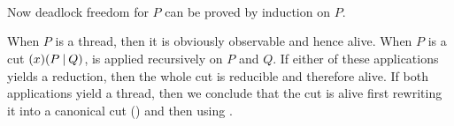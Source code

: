 \begin{code}[hide]
\\
\>[0]\AgdaSpace{}%
\AgdaSymbol{|}\AgdaSpace{}%
\AgdaSpace{}%
\AgdaSymbol{=}\<%
\\
\>[0][@{}l@{\AgdaIndent{0}}]%
\>[2]\AgdaSpace{}%
\AgdaSymbol{\AgdaUnderscore{}}\AgdaSpace{}%
\AgdaOperator{\AgdaInductiveConstructor{,}}\AgdaSpace{}%
\AgdaSpace{}%
\AgdaOperator{\AgdaInductiveConstructor{,}}\AgdaSpace{}%
\AgdaSpace{}%
\AgdaSymbol{=}\AgdaSpace{}%
\AgdaSpace{}%
\AgdaSpace{}%
\AgdaSpace{}%
\<%
\\
%
\>[2]\AgdaSpace{}%
\AgdaSymbol{(\AgdaUnderscore{}}\AgdaSpace{}%
\AgdaOperator{\AgdaInductiveConstructor{,}}\AgdaSpace{}%
\AgdaSpace{}%
\AgdaSpace{}%
\AgdaSpace{}%
\AgdaSpace{}%
\AgdaSpace{}%
\AgdaSpace{}%
\AgdaSpace{}%
\AgdaOperator{\AgdaInductiveConstructor{,}}\AgdaSpace{}%
\AgdaSpace{}%
\AgdaSpace{}%
\AgdaSymbol{(}\AgdaSpace{}%
\AgdaSpace{}%
\AgdaSpace{}%
\AgdaSymbol{))}\<%
\end{code}

Now deadlock freedom for $P$ can be proved by induction on $P$.

\begin{code}%
\>[0]\AgdaSpace{}%
\AgdaSymbol{:}\AgdaSpace{}%
\AgdaSymbol{\}}\AgdaSpace{}%
\AgdaSymbol{(}\AgdaSpace{}%
\AgdaSymbol{:}\AgdaSpace{}%
\AgdaSpace{}%
\AgdaSymbol{)}\AgdaSpace{}%
\AgdaSpace{}%
\AgdaSpace{}%
\<%
\end{code}

When $P$ is a thread, then it is obviously observable and hence alive. When $P$
is a cut $(x)(P\mathbin| Q)$,  is applied recursively
on $P$ and $Q$. If either of these applications yields a reduction, then the
whole cut is reducible and therefore alive. If both applications yield a thread,
then we conclude that the cut is alive first rewriting it into a canonical cut
() and then using
.

